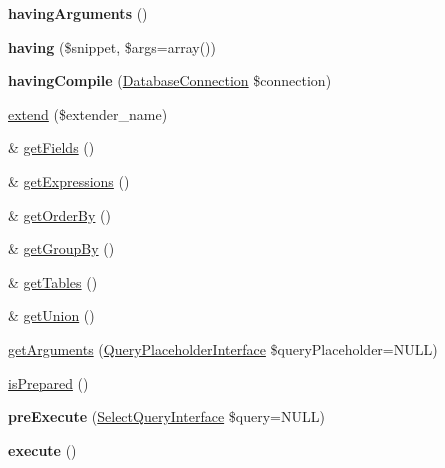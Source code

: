 \begin{DoxyCompactItemize}
\item 
\hypertarget{classSelectQueryExtender_a2a7fe02858599c1456ad490fe68ee56e}{
{\bfseries havingArguments} ()}
\label{classSelectQueryExtender_a2a7fe02858599c1456ad490fe68ee56e}

\item 
\hypertarget{classSelectQueryExtender_a942d9c0574add71b3b755872d6fbc080}{
{\bfseries having} (\$snippet, \$args=array())}
\label{classSelectQueryExtender_a942d9c0574add71b3b755872d6fbc080}

\item 
\hypertarget{classSelectQueryExtender_a76d969735fe41e9a318a0542200d833a}{
{\bfseries havingCompile} (\hyperlink{classDatabaseConnection}{DatabaseConnection} \$connection)}
\label{classSelectQueryExtender_a76d969735fe41e9a318a0542200d833a}

\item 
\hyperlink{classSelectQueryExtender_aff046880c8c40a7037f1cade3f765666}{extend} (\$extender\_\-name)
\item 
\& \hyperlink{classSelectQueryExtender_a112da9c917a0e87bba6a8452e29fb8f9}{getFields} ()
\item 
\& \hyperlink{classSelectQueryExtender_af3a9304421ec40196ce0d3df91accdb4}{getExpressions} ()
\item 
\& \hyperlink{classSelectQueryExtender_abc59bf9176493b4f5498eb895e1dcb80}{getOrderBy} ()
\item 
\& \hyperlink{classSelectQueryExtender_a1faa2d1d53456685caf7259cd2a06fc4}{getGroupBy} ()
\item 
\& \hyperlink{classSelectQueryExtender_a187dcea9ee5e466af44e5b7edfdf1428}{getTables} ()
\item 
\& \hyperlink{classSelectQueryExtender_af979cffd090d4e6bac24d2f0712ffb2a}{getUnion} ()
\item 
\hyperlink{classSelectQueryExtender_a698c3d294496989368d02e5084c27f7e}{getArguments} (\hyperlink{interfaceQueryPlaceholderInterface}{QueryPlaceholderInterface} \$queryPlaceholder=NULL)
\item 
\hyperlink{classSelectQueryExtender_a693e855f00c67fe6281c64cf0339c8ee}{isPrepared} ()
\item 
\hypertarget{classSelectQueryExtender_a787e071535566e44f7d4f329b5d6911c}{
{\bfseries preExecute} (\hyperlink{interfaceSelectQueryInterface}{SelectQueryInterface} \$query=NULL)}
\label{classSelectQueryExtender_a787e071535566e44f7d4f329b5d6911c}

\item 
\hypertarget{classSelectQueryExtender_aba0c08de1ff98b87ab8748527dc9f138}{
{\bfseries execute} ()}
\label{classSelectQueryExtender_aba0c08de1ff98b87ab8748527dc9f138}


\end{DoxyCompactItemize}
